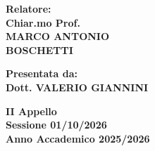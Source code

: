 \documentclass[12pt,a4paper]{report}
\begin{document}
\begin{titlepage}
\vspace{30mm}
\par
\noindent
\begin{minipage}[t]{0.50\textwidth}
{\large{\bf Relatore:\\
Chiar.mo Prof.\\
MARCO ANTONIO \\ BOSCHETTI}} \\[5mm]

%


\end{minipage}
\hfill
\begin{minipage}[t]{0.47\textwidth}\raggedleft
{\large{\bf Presentata da:\\
Dott. VALERIO GIANNINI}} \\[5mm]
\end{minipage}

\vspace{10mm}
\begin{center}
%
%
{\large{\bf II Appello \\}}
{\large{\bf Sessione 01/10/2026 \\}}
{\large{\bf Anno Accademico 2025/2026\\}}
\end{center}
\end{titlepage}
\end{document}
